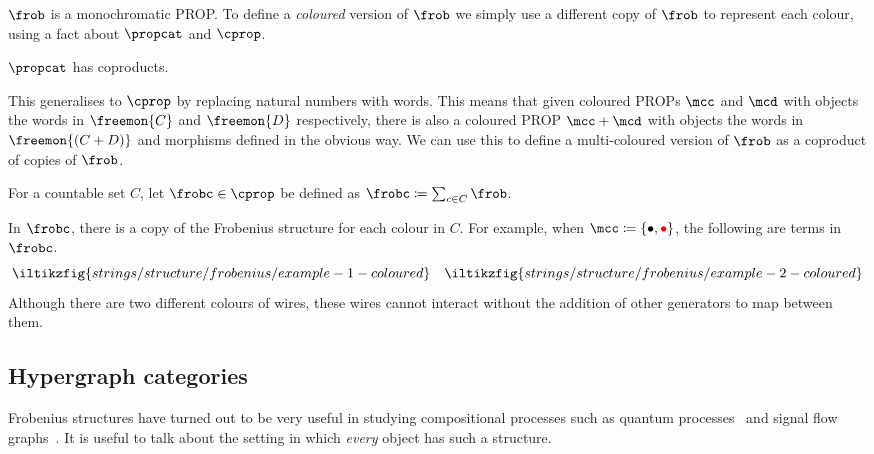 \(\frob\) is a monochromatic PROP.
To define a \emph{coloured} version of \(\frob\) we simply use a different copy
of \(\frob\) to represent each colour, using a fact about \(\propcat\) and
\(\cprop\).


\begin{theorem}
    \(\propcat\) has coproducts.
\end{theorem}

This generalises to \(\cprop\) by replacing natural numbers with words.
This means that given coloured PROPs \(\mcc\) and \(\mcd\) with objects the
words in \(\freemon{C}\) and \(\freemon{D}\) respectively, there is also a
coloured PROP \(\mcc + \mcd\) with objects the words in \(\freemon{(C + D)}\)
and morphisms defined in the obvious way.
We can use this to define a multi-coloured version of \(\frob\) as
a coproduct of copies of \(\frob\).

\begin{definition}
    \label{def:frobc}
    For a countable set \(C\), let \(\frobc \in \cprop\) be
    defined as \(\frobc \coloneqq \sum_{c \in C}\frob\).
\end{definition}

\begin{example}
    In \(\frobc\), there is a copy of the Frobenius structure for each colour
    in \(C\).
    For example, when \(\mcc \coloneqq \{\bullet,\redbullet\}\), the following
    are terms in \(\frobc\).
    \[
        \iltikzfig{strings/structure/frobenius/example-1-coloured}
        \quad
        \iltikzfig{strings/structure/frobenius/example-2-coloured}
    \]
    Although there are two different colours of wires, these wires cannot
    interact without the addition of other generators to map between them.
\end{example}


\subsection{Hypergraph categories}

Frobenius structures have turned out to be very useful in studying compositional
processes such as quantum processes~\cite{coecke2008interacting} and signal flow
graphs~\cite{bonchi2014categorical,bonchi2015full}.
It is useful to talk about the setting in which \emph{every} object has such a
structure.

